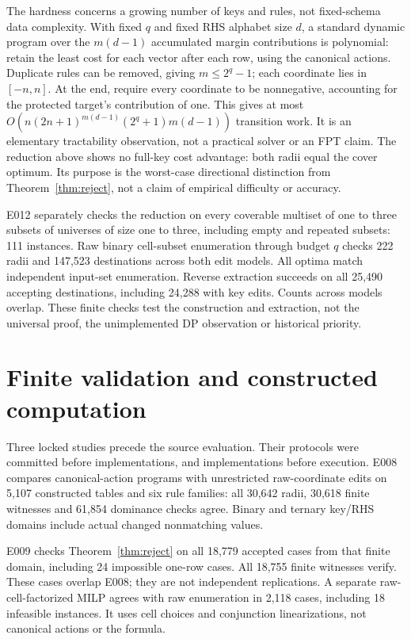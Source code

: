 \documentclass[11pt]{article}
\begin{document}
The hardness concerns a growing number of keys and rules, not fixed-schema
data complexity. With fixed $q$ and fixed RHS alphabet size $d$, a standard
dynamic program over the $m(d-1)$ accumulated margin contributions is
polynomial: retain the least cost for each vector after each row, using the
canonical actions. Duplicate rules can be removed, giving $m\leq2^q-1$;
each coordinate lies in $[-n,n]$. At the end, require every coordinate to be
nonnegative, accounting for the protected target's contribution of one.
This gives at most $O(n(2n+1)^{m(d-1)}(2^q+1)m(d-1))$ transition work.
It is an elementary tractability observation, not a practical solver or an
FPT claim. The reduction above shows no full-key cost advantage: both radii
equal the cover optimum. Its purpose is the worst-case directional distinction
from Theorem~\ref{thm:reject}, not a claim of empirical difficulty or accuracy.

E012 separately checks the reduction on every coverable multiset of one to
three subsets of universes of size one to three, including empty and repeated
subsets: 111 instances. Raw binary cell-subset enumeration through budget $q$
checks 222 radii and 147,523 destinations across both edit models. All optima
match independent input-set enumeration. Reverse extraction succeeds on all
25,490 accepting destinations, including 24,288 with key edits. Counts across
models overlap. These finite checks test the construction and extraction, not
the universal proof, the unimplemented DP observation or historical priority.

\section{Finite validation and constructed computation}
Three locked studies precede the source evaluation. Their protocols were
committed before implementations, and implementations before execution.
E008 compares canonical-action programs with unrestricted raw-coordinate edits
on 5,107 constructed tables and six rule families: all 30,642 radii, 30,618
finite witnesses and 61,854 dominance checks agree. Binary and ternary key/RHS
domains include actual changed nonmatching values.

E009 checks Theorem~\ref{thm:reject} on all 18,779 accepted cases from that finite
domain, including 24 impossible one-row cases. All 18,755 finite witnesses
verify. These cases overlap E008; they are not independent replications.
A separate raw-cell-factorized MILP agrees with raw enumeration in 2,118 cases,
including 18 infeasible instances. It uses cell choices and conjunction
linearizations, not canonical actions or the formula.
\end{document}
